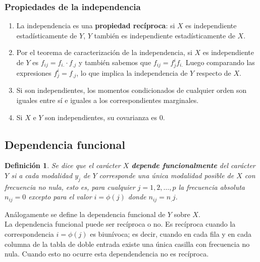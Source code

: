 \documentclass[10pt, a4paper]{article}
\makeatletter
\renewenvironment{proof}[1][\proofname] {\par\pushQED{\qed}\normalfont\topsep6\p@\@plus6\p@\relax\trivlist\item[\hskip\labelsep\itshape\sffamily#1\@addpunct{.}]\ignorespaces}{\popQED\endtrivlist\@endpefalse}
\theoremstyle{theorem-style}
\theoremstyle{definition-style}
\newtheorem{ndef}{Definición}[section]
\theoremstyle{remark-style}
\theoremstyle{example-style}
\theoremstyle{definition-style}
\theoremstyle{remark-style}
\makeatother
\begin{document}
\subsubsection{Propiedades de la independencia}

 \begin{enumerate} \item La independencia es una \textbf{propiedad recíproca}: si $X$ es
 independiente estadísticamente de $Y$, $Y$ también es independiente estadísticamente de $X$.
 
 \begin{proof}
	Por el teorema de
 caracterización de la independencia, si $X$ es independiente de $Y$ es $ f_{ij} = f_{i.}
 \cdot f_{.j} $ y también sabemos que $f_{ij} = f_j^i f_{i.}$ Luego
 comparando las expresiones  $f_j^i = f_{.j} $, lo que implica la independencia
 de $Y$ respecto de $X$.
\end{proof}

 \item Si son independientes, los momentos condicionados de cualquier orden son
 iguales entre sí e iguales a los correspondientes marginales. \item Si $X$ e $Y$
 son independientes, su covarianza es 0.

 \end{enumerate}

\subsection{Dependencia funcional}

\begin{ndef}
	Se dice que el carácter $X$ \textbf{depende funcionalmente} del carácter $Y$ si a cada
modalidad $y_j$ de $Y$ corresponde una única modalidad posible de $X$ con frecuencia
no nula, esto es, para cualquier $j=1,2,\dots,p$ la frecuencia absoluta $n_{ij} = 0$
excepto para el valor $i = \phi (j)$ donde $n_{ij}=n_.j$.

\end{ndef}

Análogamente se define la dependencia funcional de $Y$ sobre $X$.
\hspace{1cm}\\

	La dependencia funcional puede ser recíproca o no. Es recíproca cuando la
	correspondencia $i = \phi (j)$ es biunívoca; es decir, cuando en cada fila y
	en cada columna de la tabla de doble entrada existe una única casilla con
	frecuencia no nula. Cuando esto no ocurre esta dependendencia no es recíproca.
\end{document}
